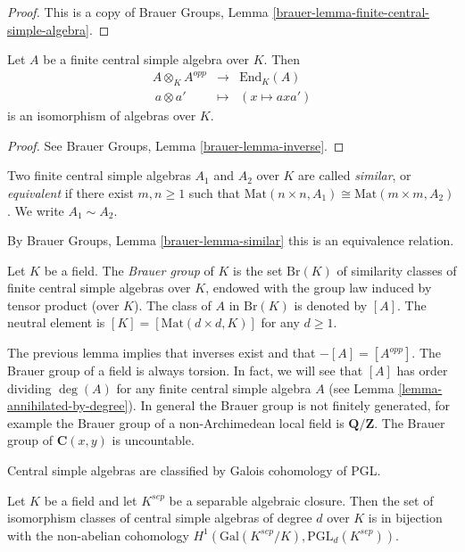 \begin{proof}
This is a copy of
Brauer Groups, Lemma \ref{brauer-lemma-finite-central-simple-algebra}.
\end{proof}

\begin{lemma}
\label{lemma-brauer-inverse}
Let $A$ be a finite central simple algebra over $K$. Then
$$
\begin{matrix}
A \otimes_K A^{opp} & \longrightarrow & \text{End}_K(A) \\
\ a \otimes a' & \longmapsto & (x \mapsto a x a')
\end{matrix}
$$
is an isomorphism of algebras over $K$.
\end{lemma}

\begin{proof}
See
Brauer Groups, Lemma \ref{brauer-lemma-inverse}.
\end{proof}

\begin{definition}
\label{definition-brauer-equivalent}
Two finite central simple algebras $A_1$ and $A_2$ over $K$ are called
{\it similar}, or {\it equivalent} if there exist $m, n \geq 1$
such that $\text{Mat}(n \times n, A_1)
\cong \text{Mat}(m \times m, A_2)$. We write $A_1 \sim A_2$.
\end{definition}

\noindent
By Brauer Groups, Lemma \ref{brauer-lemma-similar} this is an
equivalence relation.

\begin{definition}
\label{definition-brauer-group}
Let $K$ be a field. The {\it Brauer group} of $K$ is the set $\text{Br} (K)$
of similarity classes of finite central simple algebras over $K$, endowed with
the group law induced by tensor product (over $K$). The class of $A$ in
$\text{Br}(K)$ is denoted by $[A]$. The neutral element is
$[K] = [\text{Mat}(d \times d, K)]$ for any $d \geq 1$.
\end{definition}

\noindent
The previous lemma implies that inverses exist and that $-[A] = [A^{opp}]$.
The Brauer group of a field is always torsion.
In fact, we will see that $[A]$ has order dividing $\deg(A)$
for any finite central simple algebra $A$ (see
Lemma \ref{lemma-annihilated-by-degree}).
In general the Brauer group is not finitely generated, for example
the Brauer group of a non-Archimedean local field is $\mathbf{Q}/\mathbf{Z}$.
The Brauer group of $\mathbf{C}(x, y)$ is uncountable.

\begin{lemma}
\label{lemma-central-simple-algebra-pgln}
\begin{slogan}
Central simple algebras are classified by Galois cohomology of PGL.
\end{slogan}
Let $K$ be a field and let $K^{sep}$ be a separable algebraic closure.
Then the set of isomorphism classes of central simple algebras of degree
$d$ over $K$ is in bijection with the non-abelian cohomology
$H^1(\text{Gal}(K^{sep}/K), \text{PGL}_d(K^{sep}))$.
\end{lemma}

